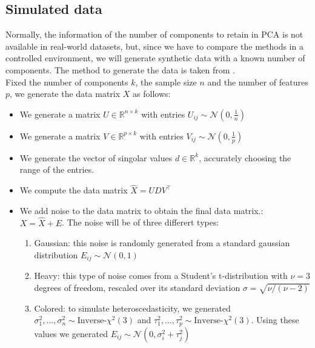 \documentclass{article}
\begin{document}
\subsection{Simulated data}
Normally, the information of the number of components to retain in PCA is not available in real-world datasets, but, since we have to compare the methods in a 
controlled environment, we will generate synthetic data with a known number of components. 
The method to generate the data is taken from \cite{perry}. 
\\
Fixed the number of components $k$, the sample size $n$ and the number of features $p$, we generate the data matrix $X$ as follows:
\begin{itemize}
    \item We generate a matrix $U \in \mathbb{R}^{n \times k}$ with entries $U_{ij} \sim \mathcal{N}\left(0,\frac{1}{n}\right)$
    \item We generate a matrix $V \in \mathbb{R}^{p \times k}$ with entries $V_{ij} \sim \mathcal{N}\left(0,\frac{1}{p}\right)$
    \item We generate the vector of singolar values $d \in \mathbb{R}^k$, accurately choosing
          the range of the entries.
    \item We compute the data matrix $\hat{X} = UDV^\top$
    \item We add noise to the data matrix to obtain the final data matrix.: \\ $X = \hat{X} + E$. 
    The noise will be of three differert types: 
    \begin{enumerate}[label=\alph*.] 
            \item Gaussian: this noise is randomly generated from a standard gaussian distribution $E_{ij} \sim \mathcal{N} (0,1)$
            \item Heavy: this type of noise comes from a Student's t-distribution with $\nu = 3$ degrees of freedom, rescaled over its standard deviation $\sigma = \sqrt{\nu/(\nu - 2)} $
            \item Colored: to simulate heteroscedasticity, we generated $\sigma_1^2,...,\sigma_n^2 \sim \text{Inverse-}\chi ^2(3)$ and $\tau_1^2,...,\tau_p^2 \sim \text{Inverse-}\chi ^2(3)$. Using these values we generated $E_{ij} \sim \mathcal{N} (0,\sigma_i^2 + \tau_j^2)$
    \end{enumerate}
\end{itemize}
\end{document}
